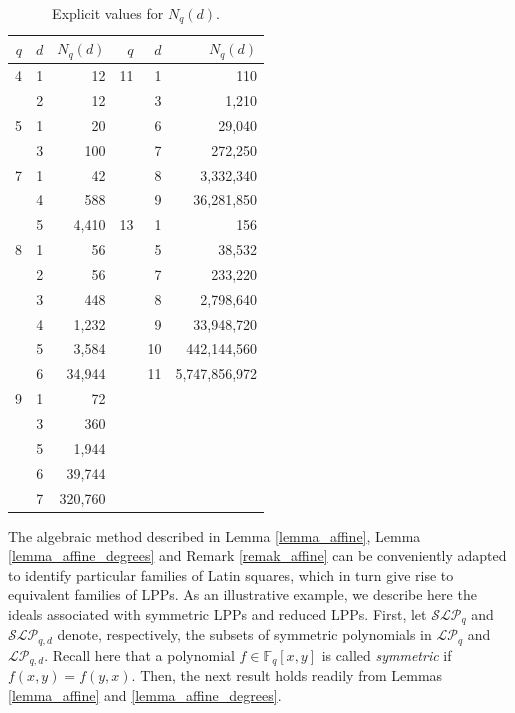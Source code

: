 \documentclass[pdflatex,sn-mathphys-num]{sn-jnl}
\theoremstyle{thmstyleone}%
\begin{document}
\begin{table}[ht]
\caption{Explicit values for $N_q(d)$.}\label{table_Pqd}%
\begin{tabular}{rrr||rrr}
$q$ & $d$  & $N_q(d)$ & $q$ & $d$  & $N_q(d)$ \\
\midrule
4   & 1   & 12     &  11 & 1 & 110\\
    & 2   & 12     &     & 3 & 1,210\\
5   & 1  & 20      &     & 6 & 29,040\\
    & 3   & 100    &     & 7 & 272,250\\ 
7   & 1  & 42      &     & 8 & 3,332,340\\
    & 4   & 588    &     & 9 & 36,281,850\\ 
    & 5 & 4,410    &  13 & 1 & 156\\
8  & 1  & 56       &     & 5 & 38,532\\
   & 2  & 56       &     & 7 & 233,220\\
   & 3  & 448      &     & 8 & 2,798,640\\
   & 4  & 1,232    &     & 9 & 33,948,720\\
   & 5  & 3,584    &     & 10 & 442,144,560\\
   & 6  & 34,944   &     & 11 & 5,747,856,972\\
9  & 1  & 72       &\\
   & 3  & 360      &\\
   & 5 & 1,944     &\\
   & 6 & 39,744    & \\
   & 7 & 320,760   &\\
\end{tabular}
\end{table}

\vspace{0.2cm}

The algebraic method described in Lemma \ref{lemma_affine}, Lemma \ref{lemma_affine_degrees} and Remark \ref{remak_affine} can be conveniently adapted to identify particular families of Latin squares, which in turn give rise to equivalent families of LPPs. As an illustrative example, we describe here the ideals associated with symmetric LPPs and reduced LPPs. First, let $\mathcal{SLP}_q$ and $\mathcal{SLP}_{q,d}$ denote, respectively, the subsets of symmetric polynomials in $\mathcal{LP}_q$ and $\mathcal{LP}_{q,d}$. Recall here that a polynomial $f\in\mathbb{F}_q[x,y]$ is called {\em symmetric} if $f(x,y)=f(y,x)$. Then, the next result holds readily from Lemmas \ref{lemma_affine} and \ref{lemma_affine_degrees}.
\end{document}
